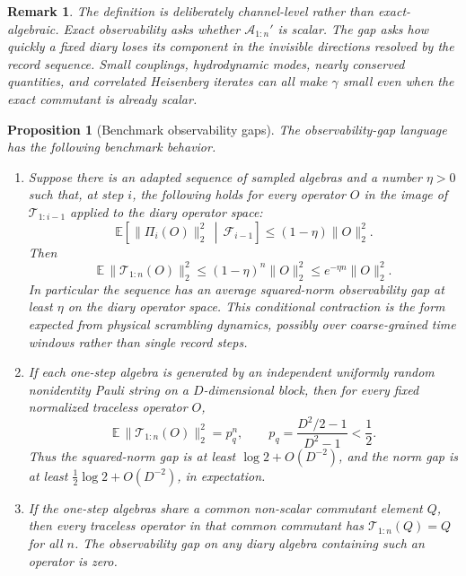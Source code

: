 \documentclass[11pt]{article}
\newtheorem{proposition}{Proposition}
\newtheorem{remark}{Remark}
\newcommand{\cA}{\mathcal A}
\newcommand{\cT}{\mathcal T}
\begin{document}
\begin{remark}
The definition is deliberately channel-level rather than exact-algebraic.
Exact observability asks whether $\cA_{1:n}'$ is scalar.  The gap asks
how quickly a fixed diary loses its component in the invisible directions
resolved by the record sequence.  Small couplings, hydrodynamic modes,
nearly conserved quantities, and correlated Heisenberg iterates can all
make $\gamma$ small even when the exact commutant is already scalar.
\end{remark}

\begin{proposition}[Benchmark observability gaps]
\label{prop:gap-benchmarks}
The observability-gap language has the following benchmark behavior.
\begin{enumerate}
  \item Suppose there is an adapted sequence of sampled algebras and a
  number $\eta>0$ such that, at step $i$, the following holds for every
  operator $O$ in the image of
  $\cT_{1:i-1}$ applied to the diary operator space:
  \begin{equation}
    \mathbb E\!\left[
      \lVert \Pi_i(O)\rVert_2^2 \,\middle|\, \mathcal F_{i-1}
    \right]
    \le
    (1-\eta)\lVert O\rVert_2^2 .
  \end{equation}
  Then
  \begin{equation}
    \mathbb E\,\lVert \cT_{1:n}(O)\rVert_2^2
    \le
    (1-\eta)^n\lVert O\rVert_2^2
    \le
    e^{-\eta n}\lVert O\rVert_2^2 .
  \end{equation}
  In particular the sequence has an average squared-norm observability
  gap at least $\eta$ on the diary operator space.  This conditional
  contraction is the form expected from physical scrambling dynamics,
  possibly over coarse-grained time windows rather than single record
  steps.

  \item If each one-step algebra is generated by an independent
  uniformly random nonidentity Pauli string on a $D$-dimensional block,
  then for every fixed normalized traceless operator $O$,
  \begin{equation}
    \mathbb E\,
    \lVert \cT_{1:n}(O)\rVert_2^2
    =
    p_q^n,
    \qquad
    p_q=\frac{D^2/2-1}{D^2-1}<\frac12 .
  \end{equation}
  Thus the squared-norm gap is at least $\log 2+O(D^{-2})$, and the
  norm gap is at least $\frac12\log 2+O(D^{-2})$, in expectation.

  \item If the one-step algebras share a common non-scalar commutant
  element $Q$, then every traceless operator in that common commutant has
  $\cT_{1:n}(Q)=Q$ for all $n$.  The observability gap on any diary
  algebra containing such an operator is zero.
\end{enumerate}
\end{proposition}
\end{document}
